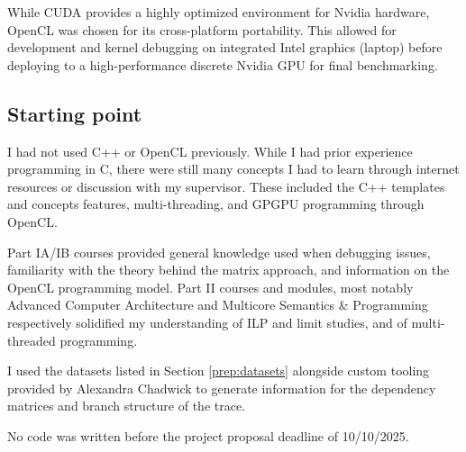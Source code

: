 While CUDA provides a highly optimized environment for Nvidia hardware, OpenCL was chosen for its cross-platform portability.
This allowed for development and kernel debugging on integrated Intel graphics (laptop) before deploying to a high-performance 
discrete Nvidia GPU for final benchmarking.

\subsection{Starting point}

I had not used C++ or OpenCL previously. While I had prior experience programming in C, there were still many concepts 
I had to learn through internet resources or discussion with my supervisor. These included the C++ templates and concepts 
features, multi-threading, and GPGPU programming through OpenCL.

Part IA/IB courses provided general knowledge used when debugging issues, 
familiarity with the theory behind the matrix approach, and information on the OpenCL programming model.
Part II courses and modules, most notably Advanced Computer Architecture and Multicore Semantics \& Programming 
respectively solidified my understanding of ILP and limit studies, and of multi-threaded programming.

I used the datasets listed in Section \ref{prep:datasets} alongside custom tooling provided by Alexandra 
Chadwick to generate information for the dependency matrices and branch structure of the trace.

No code was written before the project proposal deadline of 10/10/2025.
